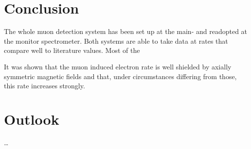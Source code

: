 
\chapter{Conclusion}
\label{ch:Conclusion}

The whole muon detection system has been set up at the main- and readopted at the monitor spectrometer. Both systems are able to take data at rates that compare well to literature values. Most of the 

It was shown that the muon induced electron rate is well shielded by axially symmetric magnetic fields and that, under circumstances differing from those, this rate increases strongly. 

\chapter{Outlook}
\label{ch:Outlook}

\dots

